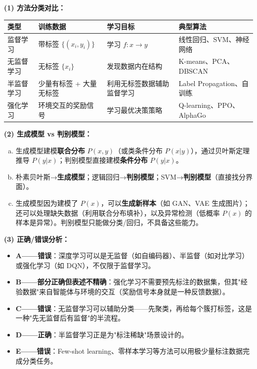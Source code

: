 \documentclass[a4paper,11pt]{ctexart}
\begin{document}
\begin{solutionbox}[参考答案与详细解析]
    \textbf{(1) 方法分类对比：}
    \begin{center}
    \begin{tabular}{p{2.8cm} p{3cm} p{3cm} p{3.5cm}}
        \toprule
        类型 & 训练数据 & 学习目标 & 典型算法 \\
        \midrule
        监督学习 & 带标签 $\{(x_i,y_i)\}$ & 学习 $f:x\to y$ & 线性回归、SVM、神经网络 \\[0.8em]
        无监督学习 & 无标签 $\{x_i\}$ & 发现数据内在结构 & K-means、PCA、DBSCAN \\[0.8em]
        半监督学习 & 少量有标签 + 大量无标签 & 利用无标签数据辅助监督学习 & Label Propagation、自训练 \\[0.8em]
        强化学习 & 环境交互的奖励信号 & 学习最优决策策略 & Q-learning、PPO、AlphaGo \\
        \bottomrule
    \end{tabular}
    \end{center}

    \textbf{(2) 生成模型 vs 判别模型：}
    \begin{enumerate}[a.]
        \item 生成模型建模\textbf{联合分布} $P(x, y)$（或类条件分布 $P(x|y)$），通过贝叶斯定理推导 $P(y|x)$；判别模型直接建模\textbf{条件分布} $P(y|x)$。
        \item 朴素贝叶斯→\textbf{生成模型}；逻辑回归→\textbf{判别模型}；SVM→\textbf{判别模型}（直接找分界面）。
        \item 生成模型因为建模了 $P(x)$，可以\textbf{生成新样本}（如 GAN、VAE 生成图片）；还可以处理缺失数据（利用联合分布填补），以及异常检测（低概率 $P(x)$ 的样本是异常）。判别模型只能做分类/回归，不具备这些能力。
    \end{enumerate}

    \textbf{(3) 正确/错误分析：}
    \begin{itemize}
        \item \textbf{A——错误}：深度学习可以是无监督（如自编码器）、半监督（如对比学习）或强化学习（如 DQN），不仅限于监督学习。
        \item \textbf{B——部分正确但表述不精确}：强化学习不需要预先标注的数据集，但其"经验数据"来自智能体与环境的交互（奖励信号本身就是一种反馈数据）。
        \item \textbf{C——错误}：无监督学习可以辅助分类——先聚类，再给每个簇打标签，这是一种"先无监督后有监督"的半流程。
        \item \textbf{D——正确}：半监督学习正是为"标注稀缺"场景设计的。
        \item \textbf{E——错误}：Few-shot learning、零样本学习等方法可以用极少量标注数据完成分类任务。
    \end{itemize}
\end{solutionbox}
\end{document}
